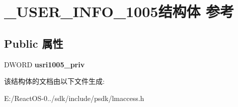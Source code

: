 \hypertarget{struct___u_s_e_r___i_n_f_o__1005}{}\section{\+\_\+\+U\+S\+E\+R\+\_\+\+I\+N\+F\+O\+\_\+1005结构体 参考}
\label{struct___u_s_e_r___i_n_f_o__1005}
\subsection*{Public 属性}
\begin{DoxyCompactItemize}
\item 
\mbox{\label{struct___u_s_e_r___i_n_f_o__1005_a0687bb591465a4f2aa0ca52533d2eb11}} 
D\+W\+O\+RD {\bfseries usri1005\+\_\+priv}
\end{DoxyCompactItemize}


该结构体的文档由以下文件生成\+:\begin{DoxyCompactItemize}
\item 
E\+:/\+React\+O\+S-\/0../sdk/include/psdk/lmaccess.\+h\end{DoxyCompactItemize}
